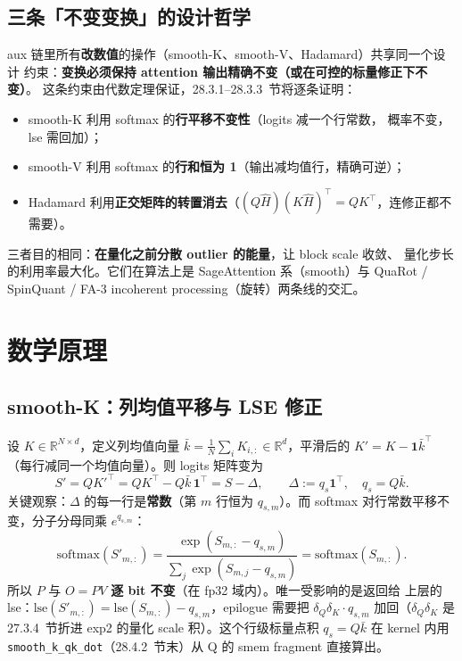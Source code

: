 \subsection{三条「不变变换」的设计哲学}

aux 链里所有\textbf{改数值}的操作（smooth-K、smooth-V、Hadamard）共享同一个设计
约束：\textbf{变换必须保持 attention 输出精确不变（或在可控的标量修正下不变）}。
这条约束由代数定理保证，28.3.1--28.3.3~节将逐条证明：
\begin{itemize}[itemsep=1pt,topsep=2pt]
  \item smooth-K 利用 softmax 的\textbf{行平移不变性}（logits 减一个行常数，
        概率不变，lse 需回加）；
  \item smooth-V 利用 softmax 的\textbf{行和恒为 1}（输出减均值行，精确可逆）；
  \item Hadamard 利用\textbf{正交矩阵的转置消去}（$(Q\hat H)(K\hat H)^{\top} =
        QK^{\top}$，连修正都不需要）。
\end{itemize}
三者目的相同：\textbf{在量化之前分散 outlier 的能量}，让 block scale 收敛、
量化步长的利用率最大化。它们在算法上是 SageAttention 系（smooth）与 QuaRot /
SpinQuant / FA-3 incoherent processing（旋转）两条线的交汇。

\section{数学原理}

\subsection{smooth-K：列均值平移与 LSE 修正}\label{sec:28-smk}

设 $K\in\mathbb{R}^{N\times d}$，定义列均值向量
$\bar k = \tfrac{1}{N}\sum_{i} K_{i,:}\in\mathbb{R}^{d}$，平滑后的
$K' = K - \mathbf{1}\bar k^{\top}$（每行减同一个均值向量）。则 logits 矩阵变为
\begin{equation}
  S' = QK'^{\top} = QK^{\top} - Q\bar k\,\mathbf{1}^{\top} = S - \Delta,
  \qquad \Delta \mathrel{:=} q_s \mathbf{1}^{\top},\quad q_s = Q\bar k .
  \label{eq:28-smk-shift}
\end{equation}
关键观察：$\Delta$ 的每一行是\textbf{常数}（第 $m$ 行恒为 $q_{s,m}$）。而 softmax
对行常数平移不变，分子分母同乘 $e^{q_{s,m}}$：
\begin{equation}
  \mathrm{softmax}\!\left(S'_{m,:}\right)
  = \frac{\exp(S_{m,:} - q_{s,m})}{\sum_j \exp(S_{m,j} - q_{s,m})}
  = \mathrm{softmax}\!\left(S_{m,:}\right).
  \label{eq:28-smk-invariant}
\end{equation}
所以 $P$ 与 $O = PV$ \textbf{逐 bit 不变}（在 fp32 域内）。唯一受影响的是返回给
上层的 lse：$\mathrm{lse}(S'_{m,:}) = \mathrm{lse}(S_{m,:}) - q_{s,m}$，epilogue
需要把 $\delta_Q\delta_K \cdot q_{s,m}$ 加回（$\delta_Q\delta_K$ 是 27.3.4~节折进
exp2 的量化 scale 积）。这个行级标量点积 $q_s = Q\bar k$ 在 kernel 内用
\texttt{smooth\_k\_qk\_dot}（28.4.2~节末）从 Q 的 smem fragment 直接算出。

